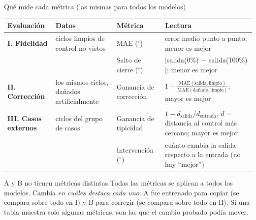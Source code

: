 \documentclass[aspectratio=169,10pt,t]{beamer}
\newcommand{\gr}{$^\circ$}
\newcommand{\mae}{\ensuremath{\mathrm{MAE}}}
\begin{document}
\begin{frame}{Qué mide cada métrica (las mismas para todos los modelos)}
\footnotesize
\renewcommand{\arraystretch}{1.15}
\begin{tabularx}{\textwidth}{@{}>{\raggedright\arraybackslash}p{2.6cm}>{\raggedright\arraybackslash}p{3.6cm}>{\raggedright\arraybackslash}p{2.6cm}>{\raggedright\arraybackslash}X@{}}
\toprule
\textbf{Evaluación} & \textbf{Datos} & \textbf{Métrica} & \textbf{Lectura}\\
\midrule
\textbf{I. Fidelidad} & 47 ciclos limpios de control no vistos & \mae{} (\gr) & error medio punto a punto; menor es mejor\\
 & & Salto de cierre (\gr) & $|$salida(0\%) $-$ salida(100\%)$|$; menor es mejor\\
\textbf{II. Corrección} & los mismos ciclos, dañados artificialmente & Ganancia de corrección & $1-\frac{\mae(\text{salida},\text{limpio})}{\mae(\text{dañado},\text{limpio})}$; mayor es mejor\\
\textbf{III. Casos externos} & 130 ciclos del grupo de casos & Ganancia de tipicidad & $1-d_{\text{salida}}/d_{\text{entrada}}$, $d$ = distancia al control más cercano; mayor es mejor\\
 & & Intervención (\gr) & cuánto cambia la salida respecto a la entrada (no hay ``mejor'')\\
\bottomrule
\end{tabularx}

\vspace{2pt}
\begin{block}{A y B no tienen métricas distintas}\small
Todas las métricas se aplican a todos los modelos. Cambia \emph{en cuáles destaca cada uno}: A fue entrenado para copiar (se compara sobre todo en I) y B para corregir (se compara sobre todo en II). Si una tabla muestra solo algunas métricas, son las que el cambio probado podía mover.
\end{block}
\end{frame}
\end{document}
